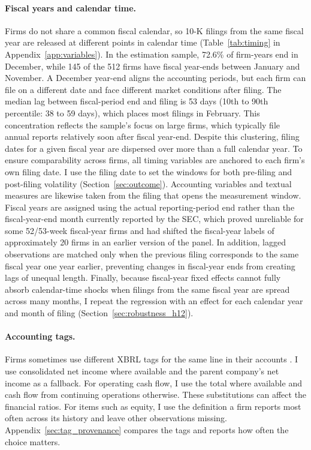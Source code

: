 \paragraph{Fiscal years and calendar time.} Firms do not share a common
fiscal calendar, so 10-K filings from the same fiscal year are released at
different points in calendar time (Table~\ref{tab:timing} in
Appendix~\ref{app:variables}). In the estimation sample, 72.6\% of
firm-years end in December, while 145 of the 512 firms have fiscal year-ends
between January and November. A December year-end aligns the accounting periods, but each firm can file on a different date and face different market conditions after filing. The median lag between fiscal-period end and
filing is 53 days (10th to 90th percentile: 38 to 59 days), which places most
filings in February. This concentration reflects the sample's focus on large
firms, which typically file annual reports relatively soon after fiscal
year-end. Despite this clustering, filing dates for a given fiscal year are
dispersed over more than a full calendar year. To ensure comparability across
firms, all timing variables are anchored to each firm's own filing date.
I use the filing date to set the windows for both pre-filing and post-filing volatility (Section~\ref{sec:outcome}). Accounting
variables and textual measures are likewise taken from the filing that opens
the measurement window. Fiscal years are assigned using the actual
reporting-period end rather than the fiscal-year-end month currently reported
by the SEC, which proved unreliable for some 52/53-week fiscal-year firms and
had shifted the fiscal-year labels of approximately 20 firms in an earlier
version of the panel. In addition, lagged observations are matched only when
the previous filing corresponds to the same fiscal year one year earlier,
preventing changes in fiscal-year ends from creating lags of unequal length.
Finally, because fiscal-year fixed effects cannot fully absorb calendar-time
shocks when filings from the same fiscal year are spread across many months,
I repeat the regression with an effect for each calendar year and month of filing
(Section~\ref{sec:robustness_h12}).

\paragraph{Accounting tags.} Firms sometimes use different XBRL tags for the same line in their accounts \parencite{chychyla2015}. I use consolidated net income where available and the parent company's net income as a fallback. For operating cash flow, I use the total where available and cash flow from continuing operations otherwise. These substitutions can affect the financial ratios. For items such as equity, I use the definition a firm reports most often across its history and leave other observations missing. Appendix~\ref{sec:tag_provenance} compares the tags and reports how often the choice matters.

